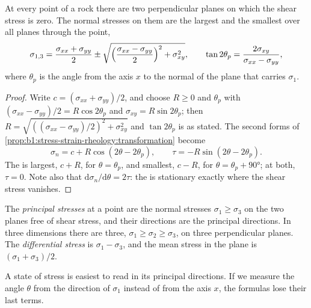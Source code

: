 \begin{theorem}\label{thm:b1:stress-strain-rheology:principal}
At every point of a rock there are two perpendicular planes on which the shear
stress is zero. The normal stresses on them are the largest and the smallest
 over all planes through the point,
\[
  \sigma_{1,3} = \frac{\sigma_{xx}+\sigma_{yy}}{2} \pm
  \sqrt{\Bigl(\frac{\sigma_{xx}-\sigma_{yy}}{2}\Bigr)^2 + \sigma_{xy}^2},
  \qquad \tan2\theta_p = \frac{2\sigma_{xy}}{\sigma_{xx}-\sigma_{yy}},
\]
where $\theta_p$ is the angle from the axis $x$ to the normal of the plane
that carries $\sigma_1$.
\end{theorem}

\begin{proof}
Write $c = (\sigma_{xx}+\sigma_{yy})/2$, and choose $R \ge 0$ and $\theta_p$
with $(\sigma_{xx}-\sigma_{yy})/2 = R\cos2\theta_p$ and
$\sigma_{xy} = R\sin2\theta_p$; then
$R = \sqrt{((\sigma_{xx}-\sigma_{yy})/2)^2 + \sigma_{xy}^2}$ and
$\tan2\theta_p$ is as stated. The second forms of
\cref{prop:b1:stress-strain-rheology:transformation} become
\[
  \sigma_n = c + R\cos(2\theta - 2\theta_p), \qquad \tau = -R\sin(2\theta - 2\theta_p).
\]
The  is largest, $c + R$, for $\theta = \theta_p$, and smallest,
$c - R$, for $\theta = \theta_p + \ang{90}$; at both, $\tau = 0$. Note also
that $\mathrm d\sigma_n/\mathrm d\theta = 2\tau$: the  is
stationary exactly where the shear stress vanishes.
\end{proof}

\begin{definition}\label{def:b1:stress-strain-rheology:principal}
The \emph{principal stresses} at a point are the
normal stresses $\sigma_1 \ge \sigma_3$ on the two planes free of shear
stress, and their directions are the principal directions. In three
dimensions there are three, $\sigma_1 \ge \sigma_2 \ge \sigma_3$, on three
perpendicular planes. The \emph{differential stress} is $\sigma_1 - \sigma_3$, and the mean stress in the plane is
$(\sigma_1+\sigma_3)/2$.
\end{definition}

A state of stress is easiest to read in its principal directions. If we
measure the angle $\theta$ from the direction of $\sigma_1$ instead of from
the axis $x$, the formulas lose their last terms.

